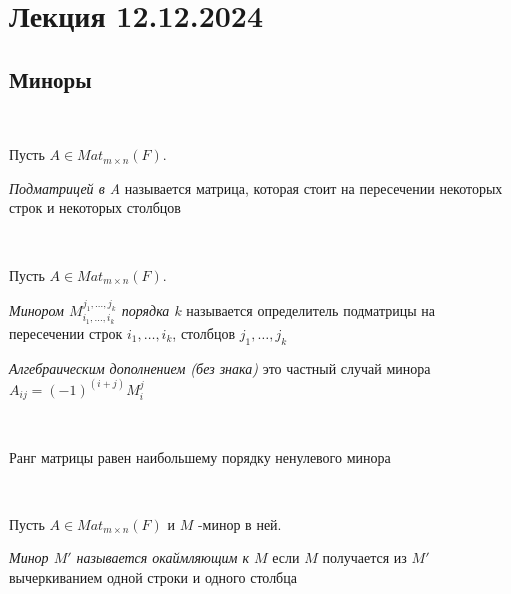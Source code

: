 \section{Лекция 12.12.2024}


\subsection{Миноры}


\begin{definition}~
    
    Пусть $A \in Mat_{m \times n}(F)$.
    
    \textit{Подматрицей в A} называется матрица, которая стоит на пересечении некоторых строк и некоторых столбцов

\end{definition}


\bigskip


\begin{definition}~
    
    Пусть $A \in Mat_{m \times n}(F)$.

    \textit{Минором $M_{i_1, \dots, i_k}^{j_1, \dots, j_k}$ порядка $k$} называется определитель подматрицы на пересечении строк $i_1, \dots, i_k$, столбцов $j_1, \dots, j_k$

    \textit{Алгебраическим дополнением (без знака)} это частный случай минора $A_{ij} = (-1)^{(i + j)} M_{i}^{j}$

\end{definition}


\bigskip


\begin{theorem}~
    
    Ранг матрицы равен наибольшему порядку ненулевого минора

    \begin{comment}
    
        В матрице $m \times n$ количество миноров порядка $k$ равно $C^k_m \cdot C_n^k$

    \end{comment}

\end{theorem}


\bigskip


\begin{definition}~
    
    Пусть $A \in Mat_{m \times n}(F)$ и $M$ -минор в ней.

    \textit{Минор $M'$ называется окаймляющим к $M$} если $M$ получается из $M'$ вычеркиванием одной строки и одного столбца

\end{definition}


